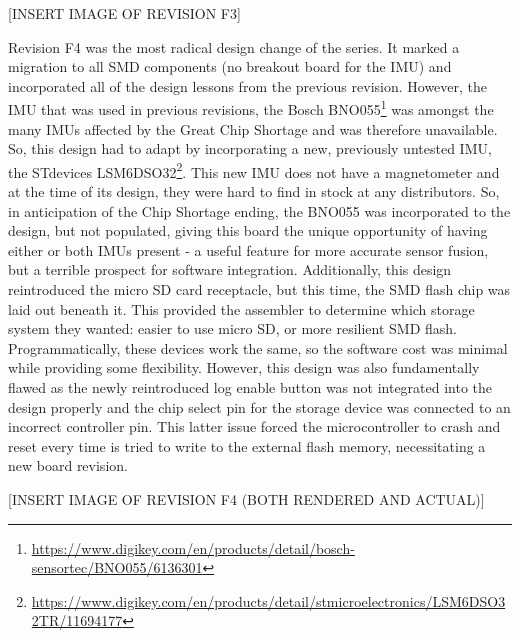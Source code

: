 [INSERT IMAGE OF REVISION F3]

Revision F4 was the most radical design change of the series.
It marked a migration to all SMD components (no breakout board for the IMU) and incorporated all of the design lessons from the previous revision.
However, the IMU that was used in previous revisions, the Bosch BNO055\footnote[2]{\url{https://www.digikey.com/en/products/detail/bosch-sensortec/BNO055/6136301}} was amongst the many IMUs affected by the Great Chip Shortage and was therefore unavailable.
So, this design had to adapt by incorporating a new, previously untested IMU, the STdevices LSM6DSO32\footnote[3]{\url{https://www.digikey.com/en/products/detail/stmicroelectronics/LSM6DSO32TR/11694177}}.
This new IMU does not have a magnetometer and at the time of its design, they were hard to find in stock at any distributors.
So, in anticipation of the Chip Shortage ending, the BNO055 was incorporated to the design, but not populated, giving this board the unique opportunity of having either or both IMUs present - a useful feature for more accurate sensor fusion, but a terrible prospect for software integration.
Additionally, this design reintroduced the micro SD card receptacle, but this time, the SMD flash chip was laid out beneath it.
This provided the assembler to determine which storage system they wanted: easier to use micro SD, or more resilient SMD flash.
Programmatically, these devices work the same, so the software cost was minimal while providing some flexibility.
However, this design was also fundamentally flawed as the newly reintroduced log enable button was not integrated into the design properly and the chip select pin for the storage device was connected to an incorrect controller pin.
This latter issue forced the microcontroller to crash and reset every time is tried to write to the external flash memory, necessitating a new board revision.

[INSERT IMAGE OF REVISION F4 (BOTH RENDERED AND ACTUAL)]

